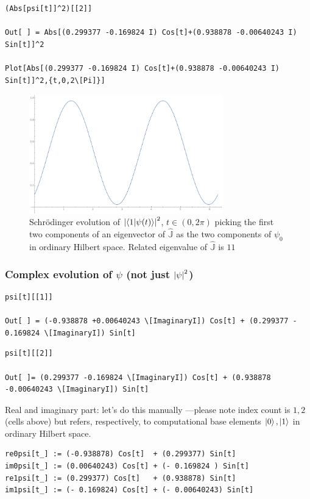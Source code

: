 \begin{lstlisting}
(Abs[psi[t]]^2)[[2]]

Out[ ] = Abs[(0.299377 -0.169824 I) Cos[t]+(0.938878 -0.00640243 I) Sin[t]]^2
  
Plot[Abs[(0.299377 -0.169824 I) Cos[t]+(0.938878 -0.00640243 I) Sin[t]]^2,{t,0,2\[Pi]}]  \end{lstlisting}
\begin{figure}[h]
  \centering
  \includegraphics[width=0.75\textwidth]{img/probB_1.png}
  \caption[(from notebook)]{
    Schr{\"o}dinger evolution of
    $\qty|\braket{1}{\psi(t)}|^2$, $t \in (0, 2\pi) $
    picking the first two components of an eigenvector of $\hat{\mathbb{J}}$
    as the two components of $\psi_0$ in ordinary Hilbert space.
    Related eigenvalue of $\hat{\mathbb{J}}$ is $11$
  }
\end{figure}

\subsubsection{Complex evolution of $\psi$ (not just $\qty|\psi|^2$)}
\begin{lstlisting}
psi[t][[1]]

Out[ ] = (-0.938878 +0.00640243 \[ImaginaryI]) Cos[t] + (0.299377 - 0.169824 \[ImaginaryI]) Sin[t]
\end{lstlisting}
\begin{lstlisting}
psi[t][[2]]

Out[ ]= (0.299377 -0.169824 \[ImaginaryI]) Cos[t] + (0.938878 -0.00640243 \[ImaginaryI]) Sin[t]
\end{lstlisting}  
Real and imaginary part: let's do this manually ---please note index count is
$1, 2$ (cells above)
but refers, respectively, to computational base elements
$\ket{0}, \ket{1}$ in ordinary Hilbert space.
\begin{lstlisting}
re0psi[t_] := (-0.938878) Cos[t]  + (0.299377) Sin[t]
im0psi[t_] := (0.00640243) Cos[t] + (- 0.169824 ) Sin[t]
re1psi[t_] := (0.299377) Cos[t]   + (0.938878) Sin[t]
im1psi[t_] := (- 0.169824) Cos[t] + (- 0.00640243) Sin[t] 
\end{lstlisting}

